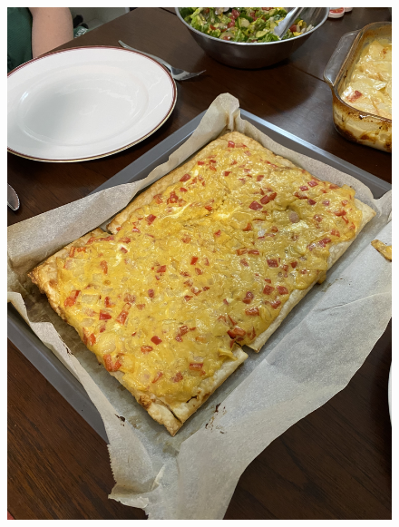 \documentclass[]{article}
\begin{document}
\newpage\begin{figure}[H]
\begin{center}\hyperref[rec:Tarte Dijonnaise]{\includegraphics[keepaspectratio,width=\textheight,height=\textwidth,angle=-90]{Gallery/Tarte Dijonnaise}}\caption*{}\label{fig:Tarte Dijonnaise}\end{center}
\end{figure}
\end{document}
